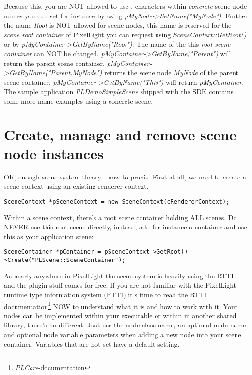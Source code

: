 Because this, you are NOT allowed to use \emph{.} characters within \emph{concrete} scene node names you can set for instance by using \emph{pMyNode->SetName("MyNode")}. Further the name \emph{Root} is NOT allowed for scene nodes, this name is reserved for the \emph{scene root container} of PixelLight you can request using \emph{SceneContext::GetRoot()} or by \emph{pMyContainer->GetByName("Root")}. The name of the this \emph{root scene container} can NOT be changed. \emph{pMyContainer->GetByName("Parent")} will return the parent scene container. \emph{pMyContainer->GetByName("Parent.MyNode")} returns the scene node \emph{MyNode} of the parent scene container. \emph{pMyContainer->GetByName("This")} will return \emph{pMyContainer}. The sample application \emph{PLDemoSimpleScene} shipped with the SDK contains some more name examples using a concrete scene.




\section{Create, manage and remove scene node instances}
OK, enough scene system theory - now to praxis. First at all, we need to create a scene context using an existing renderer context.

\begin{lstlisting}[caption=Creating a scene context instance]
SceneContext *pSceneContext = new SceneContext(cRendererContext);
\end{lstlisting}

Within a scene context, there's a root scene container holding ALL scenes. Do NEVER use this root scene directly, instead, add for instance a container and use this as your application scene:

\begin{lstlisting}[caption=Creating a new scene container instance]
SceneContainer *pContainer = pSceneContext->GetRoot()->Create("PLScene::SceneContainer");
\end{lstlisting}

As nearly anywhere in PixelLight the scene system is heavily using the RTTI - and the plugin stuff comes for free. If you are not familiar with the PixelLight runtime type information system (RTTI) it's time to read the RTTI documentation\footnote{\emph{PLCore}-documentation} NOW to understand what it is and how to work with it. Your nodes can be implemented within your executable or within in another shared library, there's no different. Just use the node class name, an optional node name and optional node variable parameters when adding a new node into your scene container. Variables that are not set have a default setting.

